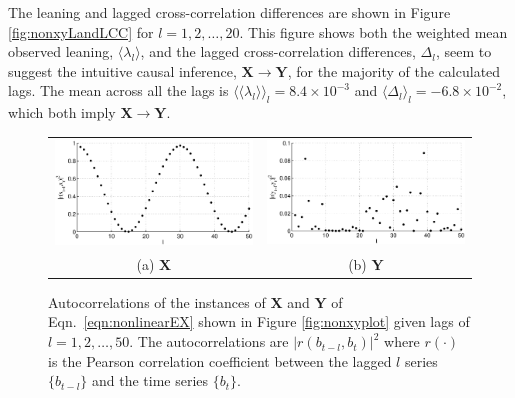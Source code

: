 \documentclass{article}[10pt]
\begin{document}
The leaning and lagged cross-correlation differences are shown in Figure \ref{fig:nonxyLandLCC} for $l=1,2,\ldots,20$.  This figure shows both the weighted mean observed leaning, $\langle \lambda_l\rangle$, and the lagged cross-correlation differences, $\Delta_l$, seem to suggest the intuitive causal inference, $\mathbf{X}\rightarrow\mathbf{Y}$, for the majority of the calculated lags.  The mean across all the lags is $\langle\langle\lambda_l\rangle\rangle_l=8.4\times 10^{-3}$ and $\langle\Delta_l\rangle_l=-6.8\times 10^{-2}$, which both imply $\mathbf{X}\rightarrow\mathbf{Y}$.  
\begin{figure}[ht]
\begin{tabular}{cc}
\includegraphics[scale=0.48]{NonlinearResponseExample_autocorrX.eps} & \includegraphics[scale=0.48]{NonlinearResponseExample_autocorrY.eps} \\
(a) $\mathbf{X}$ & (b) $\mathbf{Y}$
\end{tabular}
\caption{Autocorrelations of the instances of $\mathbf{X}$ and $\mathbf{Y}$ of Eqn.\ \ref{eqn:nonlinearEX} shown in Figure \ref{fig:nonxyplot} given lags of $l=1,2,\ldots,50$.  The autocorrelations are $|r(b_{t-l},b_t)|^2$ where $r(\cdot)$ is the Pearson correlation coefficient between the lagged $l$ series $\{b_{t-l}\}$ and the time series $\{b_{t}\}$.}
\label{fig:nonxyautocorr}
\end{figure}
\end{document}
